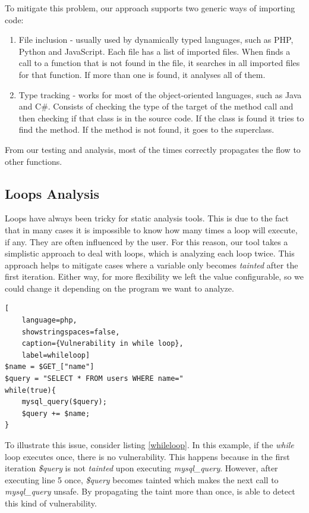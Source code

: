 To mitigate this problem, our approach supports two generic ways of importing code:
\begin{enumerate}
    \item File inclusion - usually used by dynamically typed languages, such as PHP, Python and JavaScript. Each file has a list of imported files. When \toolname{} finds a call to a function that is not found in the file, it searches in all imported files for that function. If more than one is found, it analyses all of them.
    
    \item Type tracking - works for most of the object-oriented languages, such as Java and C\#. Consists of checking the type of the target of the method call and then checking if that class is in the source code. If the class is found it tries to find the method. If the method is not found, it goes to the superclass.
\end{enumerate}

From our testing and analysis, most of the times \toolname{} correctly propagates the flow to other functions.


\subsection{Loops Analysis}
\label{loops}
Loops have always been tricky for static analysis tools. This is due to the fact that in many cases it is impossible to know how many times a loop will execute, if any. They are often influenced by the user. For this reason, our tool takes a simplistic approach to deal with loops, which is analyzing each loop twice. This approach helps to mitigate cases where a variable only becomes \textit{tainted} after the first iteration. Either way, for more flexibility we left the value configurable, so we could change it depending on the program we want to analyze. 


\begin{lstlisting}[
    language=php,
    showstringspaces=false,
    caption={Vulnerability in while loop},
    label=whileloop] 
$name = $GET_["name"]    
$query = "SELECT * FROM users WHERE name=" 
while(true){
    mysql_query($query);
    $query += $name;
}
\end{lstlisting}

To illustrate this issue, consider listing \ref{whileloop}. In this example, if the \textit{while} loop executes once, there is no vulnerability. This happens because in the first iteration \textit{\$query} is not \textit{tainted} upon executing \textit{mysql\_query}. However, after executing line 5 once, \textit{\$query} becomes tainted which makes the next call to \textit{mysql\_query} unsafe. By propagating the taint more than once, \toolname{} is able to detect this kind of vulnerability.


